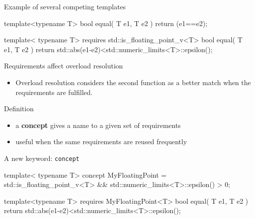 \begin{frame}[fragile]
  \begin{exampleblock}{Example of several competing templates}
    \small
    \begin{cppcode*}{}
    template<typename T>
    bool equal( T e1, T e2 ) { return (e1==e2); }

    template< typename T>
    requires std::is_floating_point_v<T>
    bool equal( T e1, T e2 )
    {return std::abs(e1-e2)<std::numeric_limits<T>::epsilon();}
    \end{cppcode*}
  \end{exampleblock}
  \begin{block}{Requirements affect overload resolution}
    \begin{itemize}
      \item Overload resolution considers the second function as a better match when the requirements are fulfilled.
    \end{itemize}
  \end{block}
\end{frame}

\begin{frame}[fragile]
    \begin{block}{Definition}
      \begin{itemize}
      \item a \textbf{concept} gives a name to a given set of requirements
      \item useful when the same requirements are reused frequently
      \end{itemize}
    \end{block}
    \begin{exampleblock}{A new keyword: \texttt{concept}}
      \small
      \begin{cppcode*}{}
      template< typename T>
      concept MyFloatingPoint =
        std::is_floating_point_v<T> &&
        std::numeric_limits<T>::epsilon() > 0;

      template<typename T>
      requires MyFloatingPoint<T>
      bool equal( T e1, T e2 )
      {return std::abs(e1-e2)<std::numeric_limits<T>::epsilon();}
      \end{cppcode*}
    \end{exampleblock}
\end{frame}

